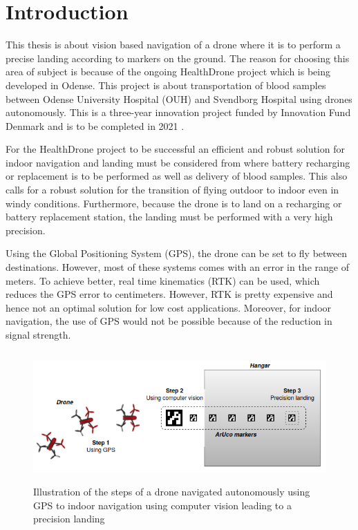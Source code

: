 \documentclass[../Head/report.tex]{subfiles}
\begin{document}
\section{Introduction}

This thesis is about vision based navigation of a drone where it is to perform a precise landing according to markers on the ground. The reason for choosing this area of subject is because of the ongoing HealthDrone project which is being developed in Odense. This project is about transportation of blood samples between Odense University Hospital (OUH) and Svendborg Hospital using drones autonomously. This is a three-year innovation project funded by Innovation Fund Denmark and is to be completed in 2021 \cite{HealthDrone}.

For the HealthDrone project to be successful an efficient and robust solution for indoor navigation and landing must be considered from where battery recharging or replacement is to be performed as well as delivery of blood samples. This also calls for a robust solution for the transition of flying outdoor to indoor even in windy conditions. Furthermore, because the drone is to land on a recharging or battery replacement station, the landing must be performed with a very high precision.

Using the Global Positioning System (GPS), the drone can be set to fly between destinations. However, most of these systems comes with an error in the range of meters. To achieve better, real time kinematics (RTK) can be used, which reduces the GPS error to centimeters. However, RTK is pretty expensive and hence not an optimal solution for low cost applications. Moreover, for indoor navigation, the use of GPS would not be possible because of the reduction in signal strength. 

\begin{figure}[H]
	\centering
	\includegraphics[height=5cm]{../Figures/master_thesis_illu.png}
	\captionsetup{justification=centering}
    \caption{Illustration of the steps of a drone navigated autonomously using GPS to indoor navigation using computer vision leading to a precision landing }
    \label{fig:masterProjectIllustration}
\end{figure}
\end{document}
